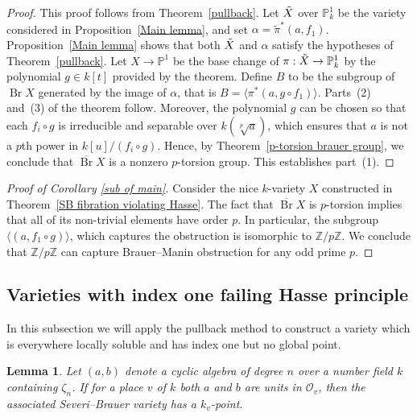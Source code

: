 \documentclass[11pt]{amsart}
\theoremstyle{plain}
\newtheorem{lemma}[thm]{Lemma}
\theoremstyle{definition}
\newcommand{\Z}{{\mathbb Z}}
\DeclareMathOperator{\Br}{Br}
\begin{document}
	\begin{proof}

   This proof follows from Theorem~\ref{pullback}. Let \(\Tilde{X}\) over 
\(\mathbb{P}^1_k\) be the variety considered in Proposition~\ref{Main lemma}, 
and set \(\alpha = \tilde{\pi}^*(a,f_1)\). Proposition~\ref{Main lemma} shows 
that both \(\Tilde{X}\) and \(\alpha\) satisfy the hypotheses of Theorem~\ref{pullback}. Let \(X \to \mathbb{P}^1\) be the base change of 
\(\pi : \Tilde{X} \to \mathbb{P}^1_k\) by the polynomial 
\(g \in k[t]\) provided by the theorem. Define \(B\) to be the subgroup of 
\(\Br X\) generated by the image of \(\alpha\), that is
\( B = \langle \pi^*(a, g \circ f_1) \rangle .\) Parts~(2) and~(3) of the theorem follow.
Moreover, the polynomial \(g\) can be chosen so that each 
\(f_i \circ g\) is irreducible and separable over \(k(\sqrt[p]{a})\),
which ensures that \(a\) is not a \(p\)th power in \(k[u]/(f_i \circ g)\). 
Hence, by Theorem~\ref{p-torsion brauer group}, we conclude that 
\(\overline{\Br}X\) is a nonzero \(p\)-torsion group. This establishes part~(1).

\end{proof}

	
\begin{proof}[{Proof of Corollary \ref{sub of main}}]
	Consider the nice $k$-variety $X$  constructed in Theorem~\ref{SB fibration violating Hasse}. The fact that \( \overline{\Br}X \) is \( p \)-torsion implies that all of its non-trivial elements have order $p$. In particular, the subgroup $\langle (a, f_1 \circ g) \rangle$, which captures the obstruction is isomorphic to $\Z/p\Z$. We conclude that $\Z/p\Z$ can capture Brauer--Manin obstruction for any odd prime $p$. 
\end{proof}


\subsection{Varieties with index one failing Hasse principle}\label{index one failing Hasse}
In this subsection we will apply the pullback method to construct a variety which is everywhere locally
soluble and has index one but no global point.

\begin{lemma}\label{unit and splitting}
Let $(a,b)$ denote a cyclic algebra of degree $n$ over a number field $k$ containing $\zeta_n$. 
If for a place $v$ of $k$ both $a$ and $b$ are units in $\mathcal{O}_v$, then the associated Severi--Brauer variety has a $k_v$-point.
\end{lemma}
\end{document}
